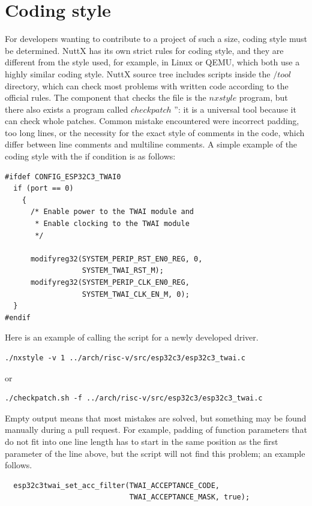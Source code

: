 \documentclass{ctuthesis}
\begin{document}
 \section{Coding style}
 For developers wanting to contribute to a project of such a size, coding style must be determined. NuttX has its own strict rules for coding style, and they are different from the style used, for example, in Linux or QEMU, which both use a highly similar coding style.  NuttX source tree includes scripts inside the  $/tool$ directory, which can check most problems with written code according to the official rules. The component that checks the file is the $nxstyle$ program, but there also exists a program called $checkpatch$ ”: it is a universal tool because it can check whole patches. Common mistake encountered were incorrect padding, too long lines, or the necessity for the exact style of comments in the code, which differ between line comments and multiline comments. A simple example of the coding style with the if condition is as follows:
\begin{verbatim}
#ifdef CONFIG_ESP32C3_TWAI0
  if (port == 0)
    {
      /* Enable power to the TWAI module and
       * Enable clocking to the TWAI module
       */

      modifyreg32(SYSTEM_PERIP_RST_EN0_REG, 0,
                  SYSTEM_TWAI_RST_M);
      modifyreg32(SYSTEM_PERIP_CLK_EN0_REG,
                  SYSTEM_TWAI_CLK_EN_M, 0);
  }
#endif
\end{verbatim}
Here is an example of calling the script for a newly developed driver.
\begin{verbatim}
./nxstyle -v 1 ../arch/risc-v/src/esp32c3/esp32c3_twai.c
\end{verbatim}
or
\begin{verbatim}
./checkpatch.sh -f ../arch/risc-v/src/esp32c3/esp32c3_twai.c
\end{verbatim}
Empty output means that most mistakes are solved, but something may be found manually during a pull request. For example, padding of function parameters that do not fit into one line length has to start in the same position as the first parameter of the line above, but the script will not find this problem; an example follows.
\begin{verbatim}
  esp32c3twai_set_acc_filter(TWAI_ACCEPTANCE_CODE,
                             TWAI_ACCEPTANCE_MASK, true);
\end{verbatim}
\end{document}
